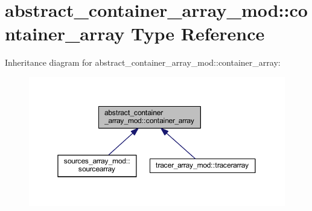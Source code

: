 \hypertarget{structabstract__container__array__mod_1_1container__array}{}\section{abstract\+\_\+container\+\_\+array\+\_\+mod\+:\+:container\+\_\+array Type Reference}
\label{structabstract__container__array__mod_1_1container__array}


Inheritance diagram for abstract\+\_\+container\+\_\+array\+\_\+mod\+:\+:container\+\_\+array\+:\nopagebreak
\begin{figure}[H]
\begin{center}
\leavevmode
\includegraphics[width=350pt]{structabstract__container__array__mod_1_1container__array__inherit__graph}
\end{center}
\end{figure}
